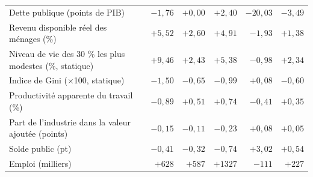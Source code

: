 \begin{tabular}{p{4.8cm}crrrrr}
Dette publique (points de PIB) & & $-1{,}76$ & $+0{,}00$ & $+2{,}40$ & $-20{,}03$ & $-3{,}49$\\
Revenu disponible réel des ménages (\%) & & $+5{,}52$ & $+2{,}60$ & $+4{,}91$ & $-1{,}93$ & $+1{,}38$\\
Niveau de vie des 30 \% les plus modestes (\%, statique) & & $+9{,}46$ & $+2{,}43$ & $+5{,}38$ & $-0{,}98$ & $+2{,}34$\\
Indice de Gini (×100, statique) & & $-1{,}50$ & $-0{,}65$ & $-0{,}99$ & $+0{,}08$ & $-0{,}60$\\
Productivité apparente du travail (\%) & & $-0{,}89$ & $+0{,}51$ & $+0{,}74$ & $-0{,}41$ & $+0{,}35$\\
Part de l'industrie dans la valeur ajoutée (points) & & $-0{,}15$ & $-0{,}11$ & $-0{,}23$ & $+0{,}08$ & $+0{,}05$\\
Solde public (pt) & & $-0{,}41$ & $-0{,}32$ & $-0{,}74$ & $+3{,}02$ & $+0{,}54$\\
Emploi (milliers) & & $+628$ & $+587$ & $+1327$ & $-111$ & $+227$\\\bottomrule\end{tabular}